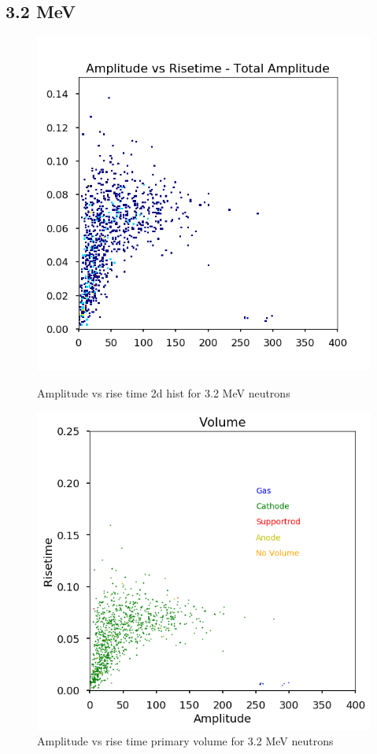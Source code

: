 \documentclass[a4paper]{article}
\begin{document}
\subsection{3.2 MeV}
\begin{figure}[H]
    \centering
    \begin{minipage}{.5\textwidth}
        \centering
        \includegraphics[width=1\linewidth]{Fast/steel_achinos-2d_fast-2.png}
        \caption{Amplitude vs rise time 2d hist for 3.2 MeV neutrons}
        \label{fig:prob1_6_2}
    \end{minipage}%
    \begin{minipage}{0.5\textwidth}
        \centering
        \includegraphics[width=1\linewidth]{Fast/steel_achinos_vol_38_fast-2.png}
        \caption{Amplitude vs rise time primary volume for 3.2 MeV neutrons}
        \label{fig:prob1_6_1}
    \end{minipage}
\end{figure}
\end{document}
